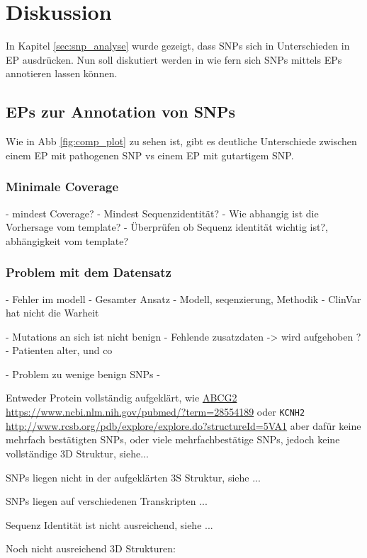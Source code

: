 \chapter{Diskussion}

In Kapitel \ref{sec:snp_analyse} wurde gezeigt, dass \ac{SNP}s sich in Unterschieden in \ac{EP} ausdrücken. Nun soll diskutiert werden in wie fern sich \ac{SNP}s mittels \ac{EP}s annotieren lassen können.

\section{EPs zur Annotation von SNPs}
\label{sec:snp_annotation}
Wie in \ac{Abb} \ref{fig:comp_plot} zu sehen ist, gibt es deutliche Unterschiede zwischen einem \ac{EP} mit pathogenen \ac{SNP} vs einem \ac{EP} mit gutartigem \ac{SNP}. 


\subsection{Minimale Coverage}
\label{sec:min_coverage}
- mindest Coverage?
- Mindest Sequenzidentität?
- Wie abhangig ist die Vorhersage vom template?
- Überprüfen ob Sequenz identität wichtig ist?, abhängigkeit vom template? 



\subsection{Problem mit dem Datensatz}
- Fehler im modell
- Gesamter Ansatz
- Modell, seqenzierung, Methodik
- ClinVar hat nicht die Warheit

- Mutations an sich ist nicht benign
- Fehlende zusatzdaten -> wird aufgehoben ?
- Patienten alter, und co

- Problem zu wenige benign SNPs
- 


Entweder Protein vollständig aufgeklärt, wie \url{ABCG2} \url{https://www.ncbi.nlm.nih.gov/pubmed/?term=28554189} oder \texttt{KCNH2} \url{http://www.rcsb.org/pdb/explore/explore.do?structureId=5VA1} aber dafür keine mehrfach bestätigten SNPs, oder viele mehrfachbestätige SNPs, jedoch keine vollständige 3D Struktur, siehe...

SNPs liegen nicht in der aufgeklärten 3S Struktur, siehe ...

SNPs liegen auf verschiedenen Transkripten ...

Sequenz Identität ist nicht ausreichend, siehe ...

Noch nicht ausreichend 3D Strukturen:


